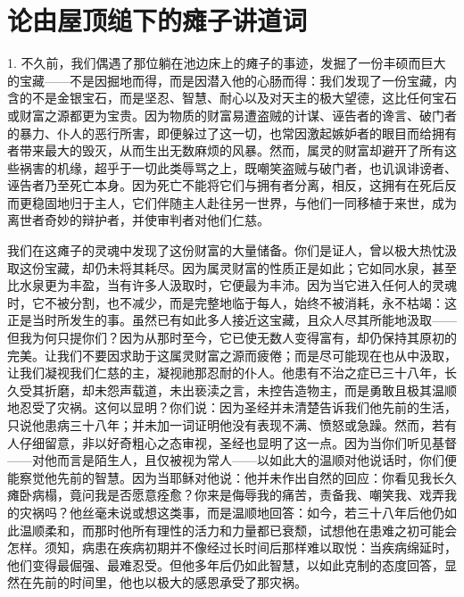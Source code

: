 
\chapter{论由屋顶缒下的瘫子讲道词}


1. 不久前，我们偶遇了那位躺在池边床上的瘫子的事迹，发掘了一份丰硕而巨大的宝藏——不是因掘地而得，而是因潜入他的心肠而得：我们发现了一份宝藏，内含的不是金银宝石，而是坚忍、智慧、耐心以及对天主的极大望德，这比任何宝石或财富之源都更为宝贵。因为物质的财富易遭盗贼的计谋、诬告者的谗言、破门者的暴力、仆人的恶行所害，即便躲过了这一切，也常因激起嫉妒者的眼目而给拥有者带来最大的毁灭，从而生出无数麻烦的风暴。然而，属灵的财富却避开了所有这些祸害的机缘，超乎于一切此类辱骂之上，既嘲笑盗贼与破门者，也讥讽诽谤者、诬告者乃至死亡本身。因为死亡不能将它们与拥有者分离，相反，这拥有在死后反而更稳固地归于主人，它们伴随主人赴往另一世界，与他们一同移植于来世，成为离世者奇妙的辩护者，并使审判者对他们仁慈。\par

我们在这瘫子的灵魂中发现了这份财富的大量储备。你们是证人，曾以极大热忱汲取这份宝藏，却仍未将其耗尽。因为属灵财富的性质正是如此；它如同水泉，甚至比水泉更为丰盈，当有许多人汲取时，它便最为丰沛。因为当它进入任何人的灵魂时，它不被分割，也不减少，而是完整地临于每人，始终不被消耗，永不枯竭：这正是当时所发生的事。虽然已有如此多人接近这宝藏，且众人尽其所能地汲取——但我为何只提你们？因为从那时至今，它已使无数人变得富有，却仍保持其原初的完美。让我们不要因求助于这属灵财富之源而疲倦；而是尽可能现在也从中汲取，让我们凝视我们仁慈的主，凝视祂那忍耐的仆人。他患有不治之症已三十八年，长久受其折磨，却未怨声载道，未出亵渎之言，未控告造物主，而是勇敢且极其温顺地忍受了灾祸。这何以显明？你们说：因为圣经并未清楚告诉我们他先前的生活，只说他患病三十八年；并未加一词证明他没有表现不满、愤怒或急躁。然而，若有人仔细留意，非以好奇粗心之态审视，圣经也显明了这一点。因为当你们听见基督——对他而言是陌生人，且仅被视为常人——以如此大的温顺对他说话时，你们便能察觉他先前的智慧。因为当耶稣对他说：他并未作出自然的回应：你看见我长久瘫卧病榻，竟问我是否愿意痊愈？你来是侮辱我的痛苦，责备我、嘲笑我、戏弄我的灾祸吗？他丝毫未说或想这类事，而是温顺地回答：如今，若三十八年后他仍如此温顺柔和，而那时他所有理性的活力和力量都已衰颓，试想他在患难之初可能会怎样。须知，病患在疾病初期并不像经过长时间后那样难以取悦：当疾病绵延时，他们变得最倔强、最难忍受。但他多年后仍如此智慧，以如此克制的态度回答，显然在先前的时间里，他也以极大的感恩承受了那灾祸。\par

